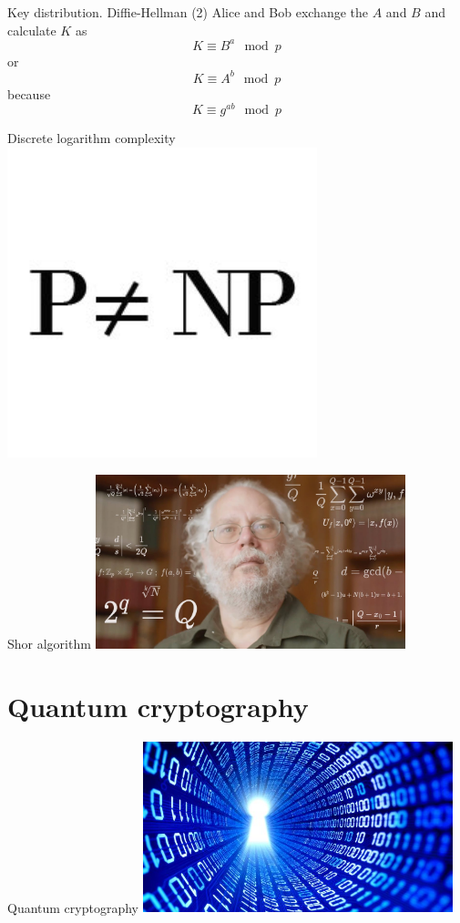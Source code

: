 \documentclass[10pt,pdf,hyperref={unicode}]{beamer}
\begin{document}
\begin{frame}{Key distribution. Diffie-Hellman (2)}
  Alice and Bob exchange the $A$ and $B$ and calculate $K$ as
  \[
  K \equiv B^a \mod{p}
  \]
  or
  \[
  K \equiv A^b \mod{p}
  \]
  because
  \[
  K \equiv g^{ab} \mod{p}
  \]
\end{frame}

\begin{frame}{Discrete logarithm complexity}
  \includegraphics[width=90mm,scale=0.5]{p_np.jpg}
\end{frame}

\begin{frame}{Shor algorithm}
  \includegraphics[width=90mm,scale=0.5]{shor.jpg}
\end{frame}


\section{Quantum cryptography}

\begin{frame}{Quantum cryptography}
  \includegraphics[width=90mm,scale=0.5]{quantum.jpg}
\end{frame}
\end{document}
